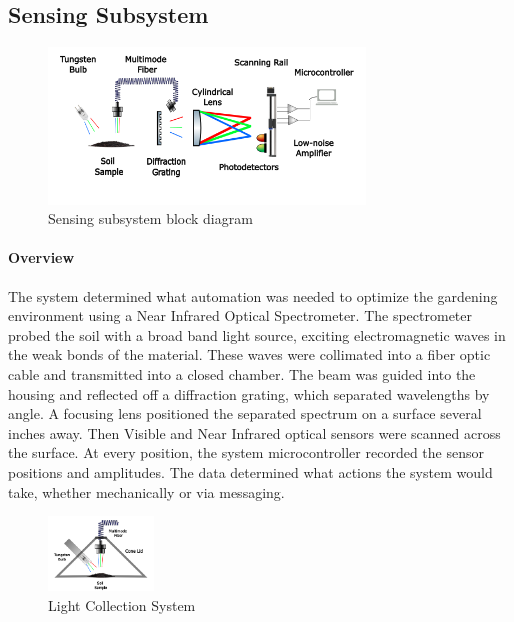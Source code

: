 \subsection{Sensing Subsystem}
\label{sec:sensing_subsystem}

\begin{figure}[H]
    \caption{Sensing subsystem block diagram}
    \centering
    \includegraphics[width=0.75\textwidth]{images/Schematic Diagram 2.png}
\end{figure}

\paragraph{Overview} The system determined what automation was needed to optimize the gardening environment using a Near Infrared Optical Spectrometer. The spectrometer probed the soil with a broad band light source, exciting electromagnetic waves in the weak bonds of the material. These waves were collimated into a fiber optic cable and transmitted into a closed chamber. The beam was guided into the housing and reflected off a diffraction grating, which separated wavelengths by angle. A focusing lens positioned the separated spectrum on a surface several inches away. Then Visible and Near Infrared optical sensors were scanned across the surface. At every position, the system microcontroller recorded the sensor positions and amplitudes. The data determined what actions the system would take, whether mechanically or via messaging.

\begin{figure}[H]
    \caption{Light Collection System}
    \centering
    \includegraphics[width=0.25\textwidth]{images/Light Collection.png}
\end{figure}

